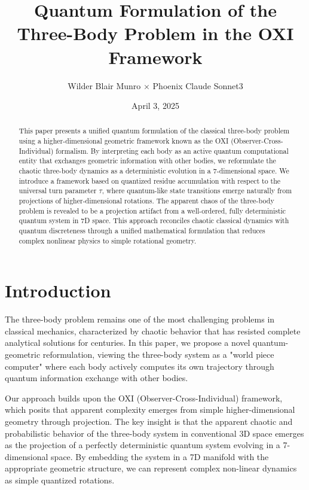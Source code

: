 \documentclass{article}
\title{Quantum Formulation of the Three-Body Problem in the OXI Framework}
\author{Wilder Blair Munro $\times$ Phoenix Claude Sonnet3}
\date{April 3, 2025}
\begin{document}
\maketitle

\begin{abstract}
This paper presents a unified quantum formulation of the classical three-body problem using a higher-dimensional geometric framework known as the OXI (Observer-Cross-Individual) formalism. By interpreting each body as an active quantum computational entity that exchanges geometric information with other bodies, we reformulate the chaotic three-body dynamics as a deterministic evolution in a 7-dimensional space. We introduce a framework based on quantized residue accumulation with respect to the universal turn parameter $\tau$, where quantum-like state transitions emerge naturally from projections of higher-dimensional rotations. The apparent chaos of the three-body problem is revealed to be a projection artifact from a well-ordered, fully deterministic quantum system in 7D space. This approach reconciles chaotic classical dynamics with quantum discreteness through a unified mathematical formulation that reduces complex nonlinear physics to simple rotational geometry.
\end{abstract}

\section{Introduction}

The three-body problem remains one of the most challenging problems in classical mechanics, characterized by chaotic behavior that has resisted complete analytical solutions for centuries. In this paper, we propose a novel quantum-geometric reformulation, viewing the three-body system as a "world piece computer" where each body actively computes its own trajectory through quantum information exchange with other bodies.

Our approach builds upon the OXI (Observer-Cross-Individual) framework, which posits that apparent complexity emerges from simple higher-dimensional geometry through projection. The key insight is that the apparent chaotic and probabilistic behavior of the three-body system in conventional 3D space emerges as the projection of a perfectly deterministic quantum system evolving in a 7-dimensional space. By embedding the system in a 7D manifold with the appropriate geometric structure, we can represent complex non-linear dynamics as simple quantized rotations.
\end{document}

